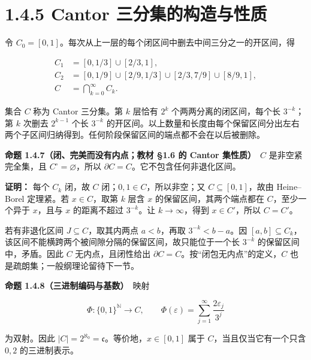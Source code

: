 \documentclass[11pt,a4paper]{article}
\begin{document}
\section[\S{}1.4.5 Cantor
三分集的构造与性质]{1.4.5 Cantor
三分集的构造与性质}\label{cantor-ux4e09ux5206ux96c6ux7684ux6784ux9020ux4e0eux6027ux8d28}

令 \(C_0=[0,1]\)。每次从上一层的每个闭区间中删去中间三分之一的开区间，得

\begin{equation*}
\begin{aligned}
C_1&=[0,1/3]\cup[2/3,1],\\
C_2&=[0,1/9]\cup[2/9,1/3]\cup[2/3,7/9]\cup[8/9,1],\\
C&=\bigcap_{k=0}^{\infty}C_k.
\end{aligned}\tag{1.4.5}
\end{equation*}

集合 \(C\) 称为 Cantor 三分集。第 \(k\) 层恰有 \(2^k\)
个两两分离的闭区间，每个长 \(3^{-k}\)；第 \(k\) 次删去 \(2^{k-1}\) 个长
\(3^{-k}\)
的开区间。以上数量和长度由每个保留区间分出左右两个子区间归纳得到。任何阶段保留区间的端点都不会在以后被删除。

\textbf{命题 1.4.7（闭、完美而没有内点；教材 §1.6 的 Cantor
集性质）}　\(C\) 是非空紧完全集，且 \(C^\circ=\varnothing\)，所以
\(\partial C=C\)。它不包含任何非退化区间。

\textbf{证明：} 每个 \(C_k\) 闭，故 \(C\) 闭；\(0,1\in C\)，所以非空；又
\(C\subseteq[0,1]\)，故由 Heine--Borel 定理紧。若 \(x\in C\)，取第 \(k\)
层含 \(x\) 的保留区间，其两个端点都在 \(C\)，至少一个异于 \(x\)，且与
\(x\) 的距离不超过 \(3^{-k}\)。让 \(k\to\infty\)，得到 \(x\in C'\)，所以
\(C=C'\)。

若有非退化区间 \(J\subseteq C\)，取其内两点 \(a<b\)，再取
\(3^{-k}<b-a\)。因
\([a,b]\subseteq C_k\)，该区间不能横跨两个被间隙分隔的保留区间，故只能位于一个长
\(3^{-k}\) 的保留区间中，矛盾。因此 \(C\) 无内点，且闭性给出
\(\partial C=C\)。按``闭包无内点''的定义，\(C\)
也是疏朗集；一般纲理论留待下一节。

\textbf{命题 1.4.8（三进制编码与基数）}　映射

\begin{equation*}
\Phi:\{0,1\}^{\mathbb N}\longrightarrow C,
\qquad \Phi(\varepsilon)=\sum_{j=1}^{\infty}\frac{2\varepsilon_j}{3^j}
\tag{1.4.6}
\end{equation*}

为双射。因此 \(|C|=2^{\aleph_0}=\mathfrak c\)。等价地，\(x\in[0,1]\)
属于 \(C\)，当且仅当它有一个只含 \(0,2\) 的三进制表示。
\end{document}
